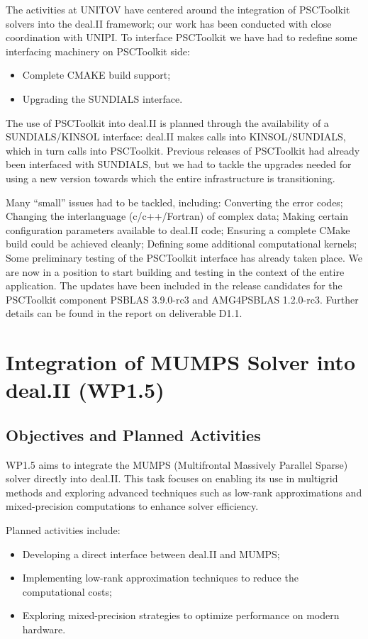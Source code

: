 \documentclass[a4paper,12pt]{article}
\begin{document}
The activities at UNITOV have centered around the integration of PSCToolkit solvers into the deal.II framework; our work has been conducted with close coordination with UNIPI. 
To interface PSCToolkit we have had to 
redefine some interfacing machinery on PSCToolkit side:
\begin{itemize}
\item Complete CMAKE build support;
\item Upgrading the SUNDIALS interface.
\end{itemize}
The use of PSCToolkit into deal.II is planned through the availability of a SUNDIALS/KINSOL interface: deal.II makes calls into KINSOL/SUNDIALS, which in turn calls into PSCToolkit. Previous releases of PSCToolkit had already been interfaced with SUNDIALS, but we had to tackle the upgrades needed for using a new version towards which the entire infrastructure is transitioning. 

Many “small” issues had to be tackled, including: 
Converting the error codes;
Changing the interlanguage (c/c++/Fortran) of complex data;
Making certain configuration parameters available to deal.II code;
Ensuring a complete CMake build could be achieved cleanly;
Defining some additional computational kernels;
Some preliminary testing of the PSCToolkit interface has already taken place.
We are now in a position to start building and testing in the context of the entire application.
The updates have been included in the release candidates for the PSCToolkit component PSBLAS 3.9.0-rc3 and AMG4PSBLAS 1.2.0-rc3. Further details can be found in the report on deliverable D1.1.



\section{Integration of MUMPS Solver into deal.II (WP1.5)}
    \subsection{Objectives and Planned Activities}
    WP1.5 aims to integrate the MUMPS (Multifrontal Massively Parallel Sparse) solver directly into deal.II. This task focuses on enabling its use in multigrid methods and exploring advanced techniques such as low-rank approximations and mixed-pre\-ci\-sion computations to enhance solver efficiency.

    Planned activities include:
    \begin{itemize}
        \item Developing a direct interface between deal.II and MUMPS;
        \item Implementing low-rank approximation techniques to reduce the computational costs;
        \item Exploring mixed-precision strategies to optimize performance on modern hardware.
    \end{itemize}
\end{document}
